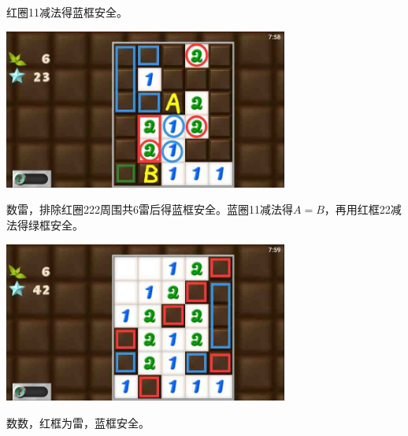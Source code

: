 红圈11减法得蓝框安全。
\begin{center}
    \includegraphics[width=0.7\textwidth]{puzzlelow/218-5.jpg}
\end{center}
数雷，排除红圈222周围共6雷后得蓝框安全。蓝圈11减法得$A=B$，再用红框22减法得绿框安全。
\begin{center}
    \includegraphics[width=0.7\textwidth]{puzzlelow/218-6.jpg}
\end{center}
数数，红框为雷，蓝框安全。

